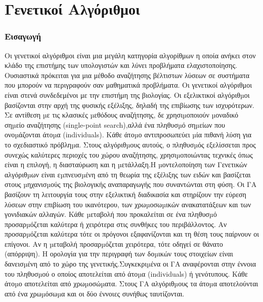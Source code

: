 \section{Γενετικοί Αλγόριθμοι}

\subsubsection{Εισαγωγή}

Οι γενετικοί αλγόριθμοι είναι μια μεγάλη κατηγορία αλγορίθμων η οποία ανήκει στον κλάδο της επιστήμης των υπολογιστών και λύνει προβλήματα ελαχιστοποίησης. Ουσιαστικά πρόκειται για μια μέθοδο αναζήτησης βέλτιστων λύσεων σε συστήματα που μπορούν να περιγραφούν σαν μαθηματικά προβλήματα. Οι γενετικοί αλγόριθμοι είναι στενά συνδεδεμένοι με την επιστήμη της βιολογίας. Οι εξελικτικοί αλγόριθµοι βασίζονται στην αρχή της φυσικής εξέλιξης, δηλαδή της επιβίωσης των ισχυρότερων. Σε αντίθεση µε τις κλασικές µεθόδους αναζήτησης, δε χρησιµοποιούν µοναδικό σηµείο αναζήτησης (single-point search),αλλά ένα πληθυσµό σηµείων που ονοµάζονται άτοµα (individuals). Κάθε άτοµο αντιπροσωπεύει µία πιθανή λύση για το σχεδιαστικό πρόβληµα. Στους αλγόριθµους αυτούς, ο πληθυσµός εξελίσσεται προς συνεχώς καλύτερες περιοχές του χώρου αναζήτησης, χρησιµοποιώντας τεχνικές όπως είναι η επιλογή, η διασταύρωση και η µετάλλαξη.Η µοντελοποίηση των Γενετικών αλγόριθµων είναι εµπνευσµένη από τη θεωρία της εξέλιξης των ειδών και βασίζεται στους µηχανισµούς της βιολογικής αναπαραγωγής που συναντώνται στη φύση. Οι ΓΑ βασίζουν τη λειτουργία τους στην εξελικτική διαδικασία και στηρίζουν την εύρεση λύσεων στην επιβίωση του ικανότερου, των χρωµοσωµικών ανακατατάξεων και των γονιδιακών αλλαγών. Κάθε µεταβολή που προκαλείται σε ένα πληθυσµό προσαρµόζεται καλύτερα ή χειρότερα στις συνθήκες του περιβάλλοντος. Αν προσαρµόζεται καλύτερα τότε οι πρόγονοι εξαφανίζονται και τη θέση τους παίρνουν οι επίγονοι. Αν η µεταβολή προσαρµόζεται χειρότερα, τότε οδηγεί σε θάνατο (απόρριψη). Η ορολογία για την περιγραφή των δοµικών τους στοιχείων είναι δανεισµένη από το χώρο της γενετικής.Συγκεκριµένα οι ΓΑ αναφέρονται στην έννοια του πληθυσµού ο οποίος αποτελείται από άτοµα (individuals) ή γενότυπους. Κάθε άτοµο αποτελείται από χρωµοσώµατα.
Στους ΓΑ αλγόριθµους τα άτοµα αποτελούνται από ένα χρωµόσωµα και οι δύο
έννοιες συνήθως ταυτίζονται.
